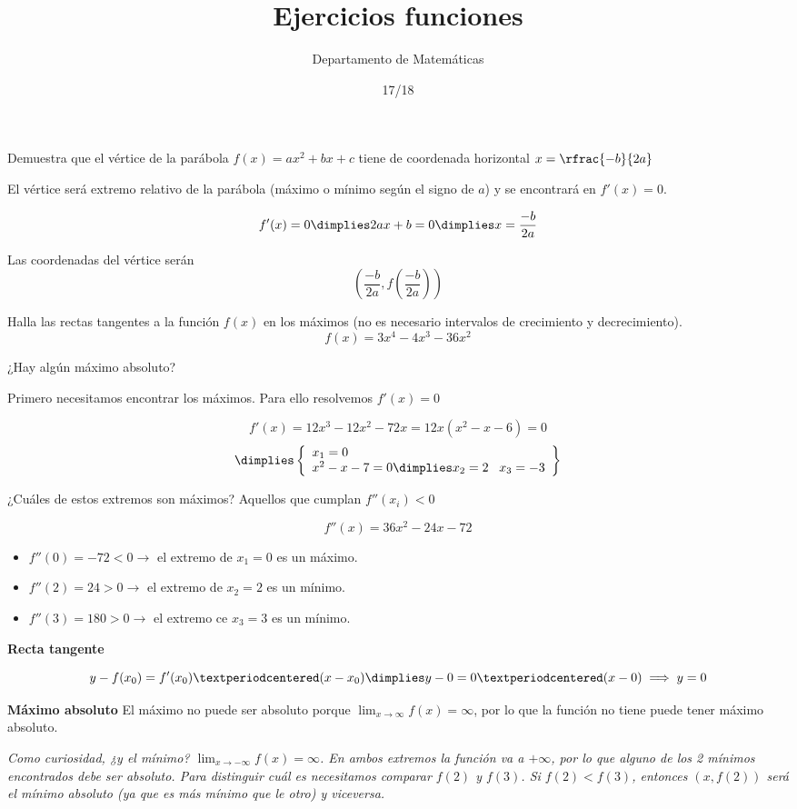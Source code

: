 \documentclass[palatino,nosec]{Docencia}
\title{Ejercicios funciones}
\author{Departamento de Matemáticas}
\date{17/18}
\begin{document}
\pagestyle{plain}

	
\begin{problem} Demuestra que el vértice de la parábola $f(x) = ax^2+bx+c$ tiene de coordenada horizontal $x=\rfrac{-b}{2a}$
\solution

El vértice será extremo relativo de la parábola (máximo o mínimo según el signo de $a$) y se encontrará en $f'(x) = 0$.

\[f'(x) = 0 \dimplies 2ax+b=0 \dimplies x=\frac{-b}{2a}\]

Las coordenadas del vértice serán \[\left(\frac{-b}{2a},f\left(\frac{-b}{2a}\right) \right)\]


\end{problem}


\begin{problem} Halla las rectas tangentes a la función $f(x)$ en los máximos (no es necesario intervalos de crecimiento y decrecimiento).
\[
f(x) = 3x^4-4x^3-36x^2
\]

¿Hay algún máximo absoluto?

\solution

Primero necesitamos encontrar los máximos. 
%
Para ello resolvemos $f'(x) = 0$

\[
f'(x) = 12x^3-12x^2-72x = 12x(x^2-x-6) = 0 \]
\[\dimplies \left\{\begin{array}{l}
x_1=0\\
x^2-x-7 = 0 \dimplies x_2 = 2 \;\;\; x_3= -3
\end{array}\right\}
\]

¿Cuáles de estos extremos son máximos? Aquellos que cumplan $f''(x_i) < 0$

\[f''(x) = 36x^2-24x-72\]
\begin{itemize}
	\item $f''(0) = -72 <0 \to $ el extremo de $x_1=0$ es un máximo. 
	\item $f''(2) = 24 > 0 \to $ el extremo de $x_2=2$ es un mínimo. 
	\item $f''(3) = 180 > 0 \to$ el extremo ce $x_3=3$ es un mínimo.
\end{itemize}

\textbf{Recta tangente}

\[
	y-f(x_0) = f'(x_0)·(x-x_0) \dimplies y-0 = 0·(x-0) \implies y=0
\]

\textbf{Máximo absoluto} El máximo no puede ser absoluto porque $\lim_{x\to\infty} f(x) = \infty$, por lo que la función no tiene puede tener máximo absoluto.

\textit{Como curiosidad, ¿y el mínimo? $\lim_{x\to-\infty}f(x) = \infty$. En ambos extremos la función va a $+\infty$, por lo que alguno de los 2 mínimos encontrados debe ser absoluto. 
%
Para distinguir cuál es necesitamos comparar $f(2)$ y $f(3)$. 
%
Si $f(2)<f(3)$, entonces $(x,f(2))$ será el mínimo absoluto (ya que es más mínimo que le otro) y viceversa.}


\end{problem}
\end{document}

